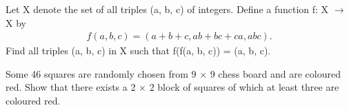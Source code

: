 \item Let X denote the set of all triples (a, b, c) of integers. Define a function f: X $\to$ X by
\begin{align*}
f(a, b, c) = (a + b + c, ab + bc + ca, abc).
\end{align*}
Find all triples (a, b, c) in X such that f(f(a, b, c)) = (a, b, c).

\item Some 46 squares are randomly chosen from 9 $\times$ 9 chess board and are coloured red. Show that there exists a 2 $\times$ 2 block of squares of which at least three are coloured red.
 






